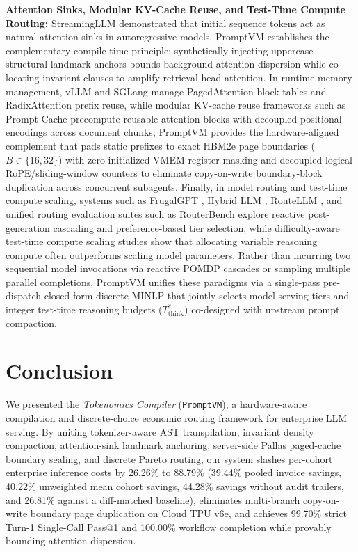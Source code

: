 \documentclass[conference,10pt]{IEEEtran}
\begin{document}
\textbf{Attention Sinks, Modular KV-Cache Reuse, and Test-Time Compute Routing:} StreamingLLM \cite{xiao2023streamingllm} demonstrated that initial sequence tokens act as natural attention sinks in autoregressive models. PromptVM establishes the complementary compile-time principle: synthetically injecting uppercase structural landmark anchors bounds background attention dispersion while co-locating invariant clauses to amplify retrieval-head attention. In runtime memory management, vLLM \cite{kwon2023vllm} and SGLang \cite{zheng2024sglang} manage PagedAttention block tables and RadixAttention prefix reuse, while modular KV-cache reuse frameworks such as Prompt Cache \cite{gim2024promptcache} precompute reusable attention blocks with decoupled positional encodings across document chunks; PromptVM provides the hardware-aligned complement that pads static prefixes to exact HBM2e page boundaries ($B \in \{16, 32\}$) with zero-initialized VMEM register masking and decoupled logical RoPE/sliding-window counters to eliminate copy-on-write boundary-block duplication across concurrent subagents. Finally, in model routing and test-time compute scaling, systems such as FrugalGPT \cite{frugalgpt2023}, Hybrid LLM \cite{ding2024hybridllm}, RouteLLM \cite{ong2025routellm}, and unified routing evaluation suites such as RouterBench \cite{hu2024routerbench} explore reactive post-generation cascading and preference-based tier selection, while difficulty-aware test-time compute scaling studies \cite{snell2024scaling} show that allocating variable reasoning compute often outperforms scaling model parameters. Rather than incurring two sequential model invocations via reactive POMDP cascades or sampling multiple parallel completions, PromptVM unifies these paradigms via a single-pass pre-dispatch closed-form discrete MINLP that jointly selects model serving tiers and integer test-time reasoning budgets ($T_{\text{think}}^*$) co-designed with upstream prompt compaction.

\section{Conclusion}
\label{sec:conclusion}
We presented the \textit{Tokenomics Compiler} (\texttt{PromptVM}), a hardware-aware compilation and discrete-choice economic routing framework for enterprise LLM serving. By uniting tokenizer-aware AST transpilation, invariant density compaction, attention-sink landmark anchoring, server-side Pallas paged-cache boundary sealing, and discrete Pareto routing, our system slashes per-cohort enterprise inference costs by 26.26\% to 88.79\% (39.44\% pooled invoice savings, 40.22\% unweighted mean cohort savings, 44.28\% savings without audit trailers, and 26.81\% against a diff-matched baseline), eliminates multi-branch copy-on-write boundary page duplication on Cloud TPU v6e, and achieves 99.70\% strict Turn-1 Single-Call Pass@1 and 100.00\% workflow completion while provably bounding attention dispersion.
\end{document}
